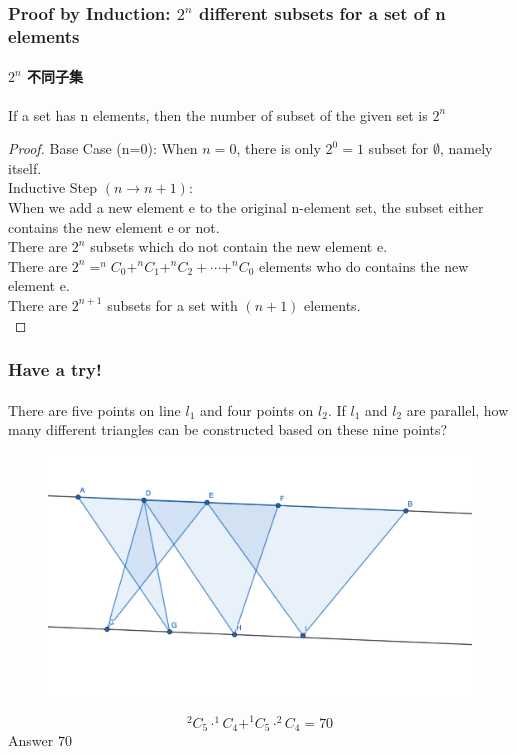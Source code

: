 \documentclass[
	11pt, %
]{beamer}
\begin{document}
\begin{frame}
	\frametitle{Proof by Induction: $2^n$ different subsets for a set of n elements }
	\framesubtitle{$2^n$ 不同子集}
		\begin{theorem}
		If a set has n elements, then the number of subset of the given set is $2^n$
	\end{theorem}

	\begin{proof}
		Base Case (n=0): When $n=0$, there is only $2^0 =1$ subset for $\emptyset$, namely itself.\\
		Inductive Step $(n \rightarrow n + 1)$: \\
		When we add a new element e to the original n-element set, the subset either contains the new element e or not.\\
		There are $2^n$ subsets which do not contain the new element  e.\\
		There are $2^n = ^nC_0+ ^nC_1 + ^nC_2 + \cdots + ^nC_0$ elements who do contains the new element e.\\
		There are $2^{n+1}$ subsets for a set with $(n + 1)$ elements.\\
	\end{proof}
\end{frame}



\begin{frame}
	\frametitle{Have a try!}
	\framesubtitle{}
There are five points on line $l_1$ and four points on $l_2$. If $l_1$ and $l_2$ are parallel, how
many different triangles can be constructed based on these nine points?
  \pause
	\begin{figure}
		\includegraphics[width=0.5\linewidth]{Triangles_Combinations.png}
	\end{figure}

	$$^2C_5 \cdot ^1C_4 + ^1C_5 \cdot^2C_4 = 70$$  
	\bigskip
	\pause
Answer \textbf{$70$} 
\end{frame}

\end{document}
